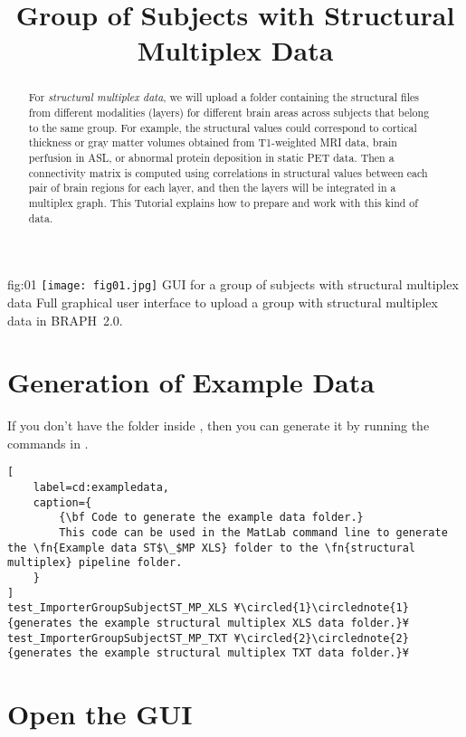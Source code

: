 \documentclass[justified]{tufte-handout}
\title{Group of Subjects with Structural Multiplex Data}
\begin{document}
\maketitle

\begin{abstract}
\noindent
For \emph{structural multiplex data}, we will upload a folder containing the structural files from different modalities (layers) for different brain areas across subjects that belong to the same group. For example, the structural values could correspond to cortical thickness or gray matter volumes obtained from T1-weighted MRI data, brain perfusion in ASL, or abnormal protein deposition in static PET data. Then a connectivity matrix is computed using correlations in structural values between each pair of brain regions for each layer, and then the layers will be integrated in a multiplex graph. This Tutorial explains how to prepare and work with this kind of data.
\end{abstract}

\tableofcontents

	{fig:01}
	{\texttt{[image: fig01.jpg]}}
	{GUI for a group of subjects with structural multiplex data}
	{
	Full graphical user interface to upload a group with structural multiplex data in BRAPH~2.0. 
	}

\clearpage
\section{Generation of Example Data}

If you don't have the  folder inside , then you can generate it by running the commands in .
%
\begin{lstlisting}[
	label=cd:exampledata,
	caption={
		{\bf Code to generate the example data folder.}
		This code can be used in the MatLab command line to generate the \fn{Example data ST$\_$MP XLS} folder to the \fn{structural multiplex} pipeline folder.
	}
]
test_ImporterGroupSubjectST_MP_XLS ¥\circled{1}\circlednote{1}{generates the example structural multiplex XLS data folder.}¥
test_ImporterGroupSubjectST_MP_TXT ¥\circled{2}\circlednote{2}{generates the example structural multiplex TXT data folder.}¥
\end{lstlisting}

\section{Open the GUI}
\end{document}
